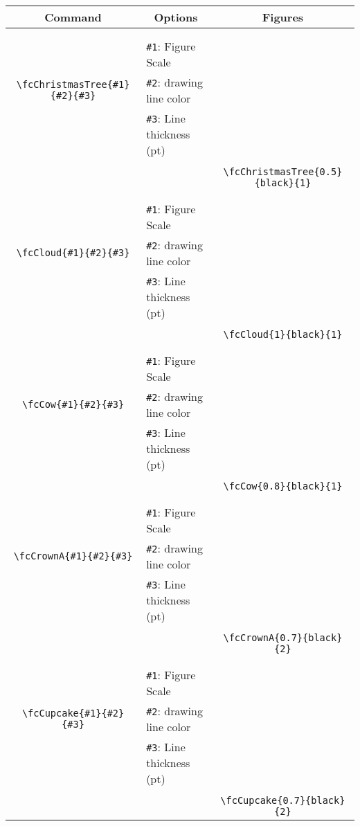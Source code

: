 \documentclass{article}
\begin{document}
\begin{table}[H]\centering\begin{tabular}{|c|l|c|}\hline {\bf Command}& \multicolumn{1}{c|}{{\bf Options}} & {\bf Figures}\\  \hline	&&\multirow{5}{*}{\fcChristmasTree{0.5}{black}{1}}\\	&&\\	&\verb|#1|: Figure Scale &\\	\verb|\fcChristmasTree{#1}{#2}{#3}|&	\verb|#2|: drawing line color &\\	&\verb|#3|: Line thickness (pt) &\\ &&\\&&	\verb|\fcChristmasTree{0.5}{black}{1}|\\\hline 	
	&&\multirow{5}{*}{\fcCloud{1}{black}{1}}\\	&&\\	&\verb|#1|: Figure Scale &\\	\verb|\fcCloud{#1}{#2}{#3}|&	\verb|#2|: drawing line color &\\	&\verb|#3|: Line thickness (pt) &\\ &&\\&&	\verb|\fcCloud{1}{black}{1}|\\\hline 	
	&&\multirow{5}{*}{\fcCow{0.8}{black}{1}}\\	&&\\	&\verb|#1|: Figure Scale &\\	\verb|\fcCow{#1}{#2}{#3}|&	\verb|#2|: drawing line color &\\	&\verb|#3|: Line thickness (pt) &\\ &&\\&&	\verb|\fcCow{0.8}{black}{1}|\\\hline 	
	&&\multirow{5}{*}{\fcCrownA{0.7}{black}{2}}\\	&&\\	&\verb|#1|: Figure Scale &\\	\verb|\fcCrownA{#1}{#2}{#3}|&	\verb|#2|: drawing line color &\\	&\verb|#3|: Line thickness (pt) &\\ &&\\&&	\verb|\fcCrownA{0.7}{black}{2}|\\\hline 	
	&&\multirow{5}{*}{\fcCupcake{0.7}{black}{2}}\\	&&\\	&\verb|#1|: Figure Scale &\\	\verb|\fcCupcake{#1}{#2}{#3}|&	\verb|#2|: drawing line color &\\	&\verb|#3|: Line thickness (pt) &\\ &&\\&&	\verb|\fcCupcake{0.7}{black}{2}|\\\hline 	

\end{tabular}
\end{table}
\end{document}
